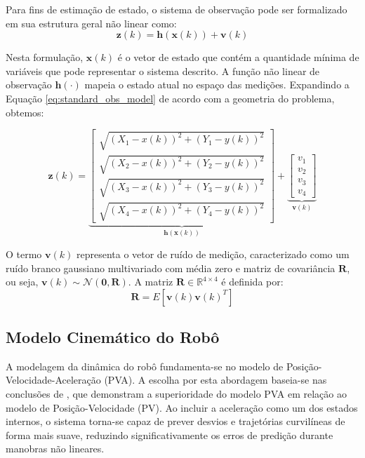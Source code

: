 \documentclass[journal]{IEEEtran}
\begin{document}
Para fins de estimação de estado, o sistema de observação pode ser formalizado em sua estrutura geral não linear como:
\begin{equation}
    \label{eq:standard_obs_model}
    \mathbf{z}(k) = \mathbf{h}(\mathbf{x}(k)) + \mathbf{v}(k)
\end{equation}

Nesta formulação, $\mathbf{x}(k)$ é o vetor de estado que contém a quantidade mínima de variáveis que pode representar o sistema descrito. A função não linear de observação $\mathbf{h}(\cdot)$ mapeia o estado atual no espaço das medições. Expandindo a Equação \eqref{eq:standard_obs_model} de acordo com a geometria do problema, obtemos:

\begin{equation}
    \label{eq:ObservationModel}
    \mathbf{z}(k) = \underbrace{\begin{bmatrix}
        \sqrt{(X_1-x(k))^2+(Y_1-y(k))^2} \\ 
        \sqrt{(X_2-x(k))^2+(Y_2-y(k))^2} \\
        \sqrt{(X_3-x(k))^2+(Y_3-y(k))^2} \\
        \sqrt{(X_4-x(k))^2+(Y_4-y(k))^2} 
    \end{bmatrix}}_{\mathbf{h}(\mathbf{x}(k))} + 
    \underbrace{\begin{bmatrix}
        v_1 \\ v_2 \\ v_3 \\ v_4 
    \end{bmatrix}}_{\mathbf{v}(k)}
\end{equation}

O termo $\mathbf{v}(k)$ representa o vetor de ruído de medição, caracterizado como um ruído branco gaussiano multivariado com média zero e matriz de covariância $\mathbf{R}$, ou seja, $\mathbf{v}(k) \sim \mathcal{N}(\mathbf{0}, \mathbf{R})$. A matriz $\mathbf{R} \in \mathbb{R}^{4\times 4}$ é definida por:
\begin{equation}
    \mathbf{R} = E[\mathbf{v}(k) \mathbf{v}(k)^T]
\end{equation}

\subsection{Modelo Cinemático do Robô}

A modelagem da dinâmica do robô fundamenta-se no modelo de Posição-Velocidade-Aceleração (PVA). A escolha por esta abordagem baseia-se nas conclusões de \cite{falek2020}, que demonstram a superioridade do modelo PVA em relação ao modelo de Posição-Velocidade (PV). Ao incluir a aceleração como um dos estados internos, o sistema torna-se capaz de prever desvios e trajetórias curvilíneas de forma mais suave, reduzindo significativamente os erros de predição durante manobras não lineares.
\end{document}
